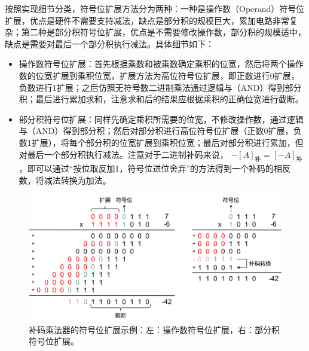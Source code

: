 按照实现细节分类，符号位扩展方法分为两种：一种是操作数（Operand）符号位扩展，优点是硬件不需要支持减法，缺点是部分积的规模巨大，累加电路非常复杂；第二种是部分积符号位扩展，优点是不需要修改操作数，部分积的规模适中，缺点是需要对最后一个部分积执行减法。具体细节如下：
\begin{itemize}
    \item 操作数符号位扩展：首先根据乘数和被乘数确定乘积的位宽，然后将两个操作数的位宽扩展到乘积位宽，扩展方法为高位符号位扩展，即正数进行0扩展，负数进行1扩展；之后仿照无符号数二进制乘法通过逻辑与（AND）得到部分积；最后进行累加求和，注意求和后的结果应根据乘积的正确位宽进行截断。
    \item 部分积符号位扩展：同样先确定乘积所需要的位宽，不修改操作数，通过逻辑与（AND）得到部分积；然后对部分积进行高位符号位扩展（正数0扩展，负数1扩展），将每个部分积的位宽扩展到乘积位宽；最后对部分积进行累加，但对最后一个部分积执行减法。注意对于二进制补码来说， $-[A]_\text{补} = [-A]_\text{补}$，即可以通过“按位取反加1，符号位进位舍弃”的方法得到一个补码的相反数，将减法转换为加法。
\end{itemize}
\begin{figure}[!htb]
    \centering
    \includegraphics[width=\textwidth]{figs/EM-Fig-符号位扩展.pdf}
    \caption{补码乘法器的符号位扩展示例：左：操作数符号位扩展，右：部分积符号位扩展。}
    \label{EM:Fig:signed_mul_sign_extension}
\end{figure}

